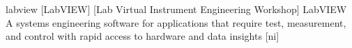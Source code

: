 \newglsXsoftware%
{labview}%
[LabVIEW]%
[Lab Virtual Instrument Engineering Workshop]%
{LabVIEW}%
{A systems engineering software for applications that require test, measurement, and control with rapid access to hardware and data insights \cite{website:NI:LabVIEW}}%
[ni]%